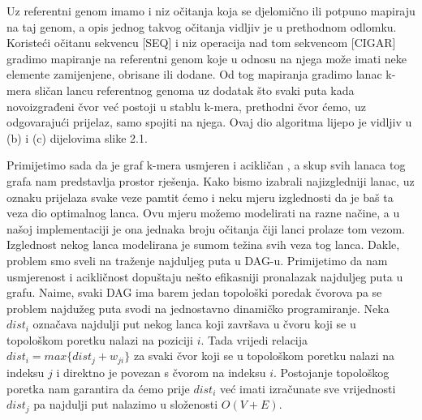Uz referentni genom imamo i niz očitanja koja se djelomično ili potpuno mapiraju na taj genom, a opis jednog takvog očitanja vidljiv je u prethodnom odlomku. Koristeći očitanu sekvencu [SEQ] i niz operacija nad tom sekvencom [CIGAR] gradimo mapiranje na referentni genom koje u odnosu na njega može imati neke elemente zamijenjene, obrisane ili dodane. Od tog mapiranja gradimo lanac k-mera sličan lancu referentnog genoma uz dodatak što svaki puta kada novoizgrađeni čvor već postoji u stablu k-mera, prethodni čvor ćemo, uz odgovarajući prijelaz, samo spojiti na njega. Ovaj dio algoritma lijepo je vidljiv u (b) i (c) dijelovima slike 2.1.

Primijetimo sada da je graf k-mera usmjeren i acikličan , a skup svih lanaca tog grafa nam predstavlja prostor rješenja. Kako bismo izabrali najizgledniji lanac, uz oznaku prijelaza svake veze pamtit ćemo i neku mjeru izglednosti da je baš ta veza dio optimalnog lanca. Ovu mjeru možemo modelirati na razne načine, a u našoj implementaciji je ona jednaka broju očitanja čiji lanci prolaze tom vezom. Izglednost nekog lanca modelirana je sumom težina svih veza tog lanca. Dakle, problem smo sveli na traženje najduljeg puta u DAG-u. Primijetimo da nam usmjerenost i acikličnost dopuštaju nešto efikasniji pronalazak najduljeg puta u grafu. Naime, svaki DAG ima barem jedan topološki poredak čvorova  pa se problem najdužeg puta svodi na jednostavno dinamičko programiranje. Neka $dist_i$ označava najdulji put nekog lanca koji završava u čvoru koji se u topološkom poretku nalazi na poziciji $i$. Tada vrijedi relacija $dist_i = max\{dist_j + w_{ji}\}$ za svaki čvor koji se u topološkom poretku nalazi na indeksu $j$ i direktno je povezan s čvorom na indeksu $i$. Postojanje topološkog poretka nam garantira da ćemo prije $dist_i$ već imati izračunate sve vrijednosti $dist_j$ pa najdulji put nalazimo u složenosti $O(V+E)$.   

